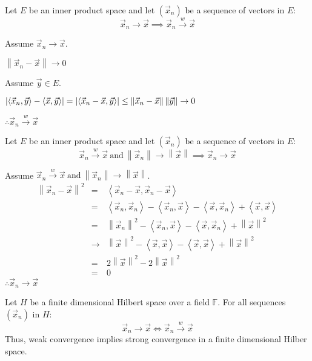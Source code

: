 \documentclass[letterpaper,12pt,fleqn]{article}
\newcommand{\vx}{\vec{x}}
\newcommand{\vy}{\vec{y}}
\newcommand{\norm}[1]{\left\|#1\right\|}
\newcommand{\inner}[1]{\left<#1\right>}
\newcommand{\weak}{\overset{w}{\longrightarrow}}
\newcommand{\F}{\mathbb{F}}
\begin{document}
\begin{theorem}
  Let $E$ be an inner product space and let $(\vx_n)$ be a sequence of vectors
  in $E$:
  \[\vx_n\to\vx\implies\vx_n\weak\vx\]
\end{theorem}

\begin{theproof}
  Assume $\vx_n\to\vx$.

  $\norm{\vx_n-\vx}\to0$

  Assume $\vy\in E$.

  $\abs{\inner{\vx_n,\vy}-\inner{\vx,\vy}}=
  \abs{\inner{\vx_n-\vx,\vy}}\le\norm{\vx_n-\vx}\norm{\vy}\to0$

  $\therefore\vx_n\weak\vx$
\end{theproof}

\begin{theorem}
  Let $E$ be an inner product space and let $(\vx_n)$ be a sequence of vectors
  in $E$:
  \[\vx_n\weak\vx\ \mbox{and}\ \norm{\vx_n}\to\norm{\vx}\implies\vx_n\to\vx\]
\end{theorem}

\begin{theproof}
  Assume $\vx_n\weak\vx\ \mbox{and}\ \norm{\vx_n}\to\norm{\vx}$.
  \begin{eqnarray*}
    \norm{\vx_n-\vx}^2 &=& \inner{\vx_n-\vx,\vx_n-\vx} \\
    &=& \inner{\vx_n,\vx_n}-\inner{\vx_n,\vx}-\inner{\vx,\vx_n}+
    \inner{\vx,\vx} \\
    &=& \norm{\vx_n}^2-\inner{\vx_n,\vx}-\inner{\vx,\vx_n}+\norm{\vx}^2 \\
    &\to& \norm{\vx}^2 -\inner{\vx,\vx}-\inner{\vx,\vx}+\norm{\vx}^2 \\
    &=& 2\norm{\vx}^2-2\norm{\vx}^2 \\
    &=& 0
  \end{eqnarray*}
  $\therefore\vx_n\to\vx$
\end{theproof}

\begin{theorem}
  Let $H$ be a finite dimensional Hilbert space over a field $\F$. For all
  sequences $(\vx_n)$ in $H$:
  \[\vx_n\to\vx\iff\vx_n\weak\vx\]
  Thus, weak convergence implies strong convergence in a finite dimensional
  Hilber space.
\end{theorem}
\end{document}
